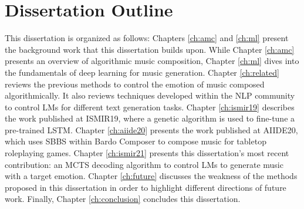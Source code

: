 
\section{Dissertation Outline}

This dissertation is organized as follows: Chapters \ref{ch:amc} and \ref{ch:ml} present the background work that this dissertation builds upon. While Chapter \ref{ch:amc} presents an overview of algorithmic music composition, Chapter \ref{ch:ml} dives into the fundamentals of deep learning for music generation. Chapter \ref{ch:related} reviews the previous methods to control the emotion of music composed algorithmically. It also reviews techniques developed within the NLP community to control LMs for different text generation tasks. Chapter \ref{ch:ismir19} describes the work published at ISMIR19, where a genetic algorithm is used to fine-tune a pre-trained LSTM. Chapter \ref{ch:aiide20} presents the work published at AIIDE20, which uses SBBS within Bardo Composer to compose music for tabletop roleplaying games. Chapter \ref{ch:ismir21} presents this dissertation's most recent contribution: an MCTS decoding algorithm to control LMs to generate music with a target emotion. Chapter \ref{ch:future} discusses the weakness of the methods proposed in this dissertation in order to highlight different directions of future work. Finally, Chapter \ref{ch:conclusion} concludes this dissertation.
